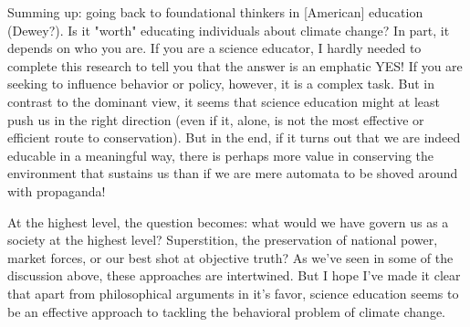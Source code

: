Summing up: going back to foundational thinkers in [American] education
(Dewey?). Is it "worth" educating individuals about climate change? In part, it
depends on who you are. If you are a science educator, I hardly needed to
complete this research to tell you that the answer is an emphatic YES! If you
are seeking to influence behavior or policy, however, it is a complex task. But
in contrast to the dominant view, it seems that science education might at least
push us in the right direction (even if it, alone, is not the most effective or
efficient route to conservation). But in the end, if it turns out that we are
indeed educable in a meaningful way, there is perhaps more value in conserving
the environment that sustains us than if we are mere automata to be shoved
around with propaganda!

At the highest level, the question becomes: what would we have govern us as a
society at the highest level? Superstition, the preservation of national power,
market forces, or our best shot at objective truth? As we've seen in some of the
discussion above, these approaches are intertwined. But I hope I've made it
clear that apart from philosophical arguments in it's favor, science education
seems to be an effective approach to tackling the behavioral problem of climate
change.
